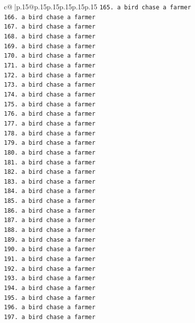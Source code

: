 \documentclass{article}
\begin{document}
{\begin{supertabular}{c@{$\;$}|p{.15\linewidth}@{}p{.15\linewidth}p{.15\linewidth}p{.15\linewidth}p{.15\linewidth}p{.15\linewidth}}
{{{\texttt{165. a bird chase a farmer} \\
\texttt{166. a bird chase a farmer} \\
\texttt{167. a bird chase a farmer} \\
\texttt{168. a bird chase a farmer} \\
\texttt{169. a bird chase a farmer} \\
\texttt{170. a bird chase a farmer} \\
\texttt{171. a bird chase a farmer} \\
\texttt{172. a bird chase a farmer} \\
\texttt{173. a bird chase a farmer} \\
\texttt{174. a bird chase a farmer} \\
\texttt{175. a bird chase a farmer} \\
\texttt{176. a bird chase a farmer} \\
\texttt{177. a bird chase a farmer} \\
\texttt{178. a bird chase a farmer} \\
\texttt{179. a bird chase a farmer} \\
\texttt{180. a bird chase a farmer} \\
\texttt{181. a bird chase a farmer} \\
\texttt{182. a bird chase a farmer} \\
\texttt{183. a bird chase a farmer} \\
\texttt{184. a bird chase a farmer} \\
\texttt{185. a bird chase a farmer} \\
\texttt{186. a bird chase a farmer} \\
\texttt{187. a bird chase a farmer} \\
\texttt{188. a bird chase a farmer} \\
\texttt{189. a bird chase a farmer} \\
\texttt{190. a bird chase a farmer} \\
\texttt{191. a bird chase a farmer} \\
\texttt{192. a bird chase a farmer} \\
\texttt{193. a bird chase a farmer} \\
\texttt{194. a bird chase a farmer} \\
\texttt{195. a bird chase a farmer} \\
\texttt{196. a bird chase a farmer} \\
\texttt{197. a bird chase a farmer} \\
}}}
\end{supertabular}}
\end{document}
